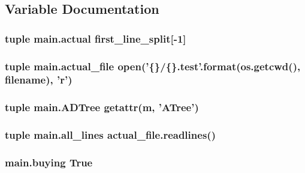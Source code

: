 \subsection{Variable Documentation}
\hypertarget{namespacemain_aefdbe12162b07e208468d2e45b949f7d}{
\subsubsection[{actual}]{\setlength{\rightskip}{0pt plus 5cm}tuple main.\-actual {\bf first\-\_\-line\-\_\-split}\mbox{[}-\/1\mbox{]}}}\label{namespacemain_aefdbe12162b07e208468d2e45b949f7d}
\hypertarget{namespacemain_a525425c50f2ffbe24b80ac781fd87ea4}{
\subsubsection[{actual\-\_\-file}]{\setlength{\rightskip}{0pt plus 5cm}tuple main.\-actual\-\_\-file open('\{\}/\{\}.test'.format(os.\-getcwd(), {\bf filename}), 'r')}}\label{namespacemain_a525425c50f2ffbe24b80ac781fd87ea4}
\hypertarget{namespacemain_a850e5686e3d530b318c9f2b73c5929f3}{
\subsubsection[{A\-D\-Tree}]{\setlength{\rightskip}{0pt plus 5cm}tuple main.\-A\-D\-Tree getattr({\bf m}, 'A\-Tree')}}\label{namespacemain_a850e5686e3d530b318c9f2b73c5929f3}
\hypertarget{namespacemain_ad72f74668d86fda5048df035955479d9}{
\subsubsection[{all\-\_\-lines}]{\setlength{\rightskip}{0pt plus 5cm}tuple main.\-all\-\_\-lines actual\-\_\-file.\-readlines()}}\label{namespacemain_ad72f74668d86fda5048df035955479d9}
\hypertarget{namespacemain_ace774159e8fcc00c1958a240079dd5e2}{
\subsubsection[{buying}]{\setlength{\rightskip}{0pt plus 5cm}main.\-buying True}}\label{namespacemain_ace774159e8fcc00c1958a240079dd5e2}

